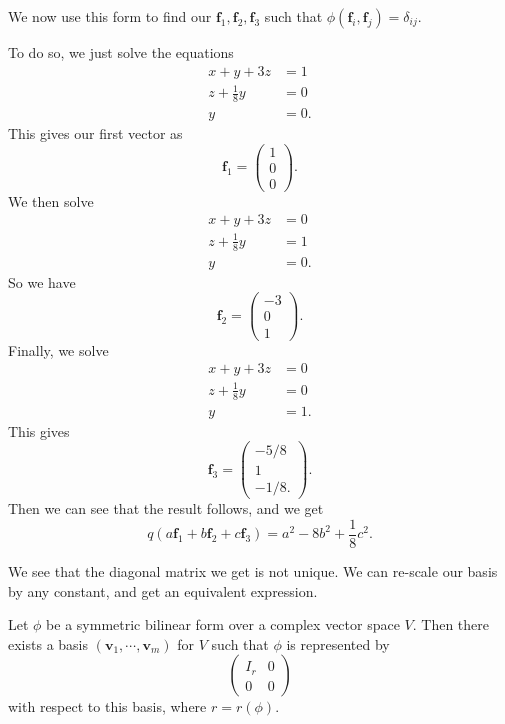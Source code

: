 \documentclass[a4paper]{article}
\begin{document}
\begin{eg}
  We now use this form to find our $\mathbf{f}_1, \mathbf{f}_2, \mathbf{f}_3$ such that $\phi(\mathbf{f}_i, \mathbf{f}_j) = \delta_{ij}$.

  To do so, we just solve the equations
  \begin{align*}
    x + y + 3z &= 1\\
    z + \frac{1}{8}y &= 0\\
    y &= 0.
  \end{align*}
  This gives our first vector as
  \[
    \mathbf{f}_1 =
    \begin{pmatrix}
      1\\0\\0
    \end{pmatrix}.
  \]
  We then solve
  \begin{align*}
    x + y + 3z &= 0\\
    z + \frac{1}{8}y &= 1\\
    y &= 0.
  \end{align*}
  So we have
  \[
    \mathbf{f}_2 =
    \begin{pmatrix}
      -3\\0\\1
    \end{pmatrix}.
  \]
  Finally, we solve
  \begin{align*}
    x + y + 3z &= 0\\
    z + \frac{1}{8}y &= 0\\
    y &= 1.
  \end{align*}
  This gives
  \[
    \mathbf{f}_3 =
    \begin{pmatrix}
      -5/8\\ 1 \\ -1/8.
    \end{pmatrix}.
  \]
  Then we can see that the result follows, and we get
  \[
    q(a\mathbf{f}_1 + b\mathbf{f}_2 + c\mathbf{f}_3) = a^2 - 8b^2 + \frac{1}{8}c^2.
  \]
\end{eg}
We see that the diagonal matrix we get is not unique. We can re-scale our basis by any constant, and get an equivalent expression.

\begin{thm}
  Let $\phi$ be a symmetric bilinear form over a complex vector space $V$. Then there exists a basis $(\mathbf{v}_1, \cdots, \mathbf{v}_m)$ for $V$ such that $\phi$ is represented by
  \[
    \begin{pmatrix}
      I_r & 0\\
      0 & 0
    \end{pmatrix}
  \]
  with respect to this basis, where $r = r(\phi)$.
\end{thm}
\end{document}
